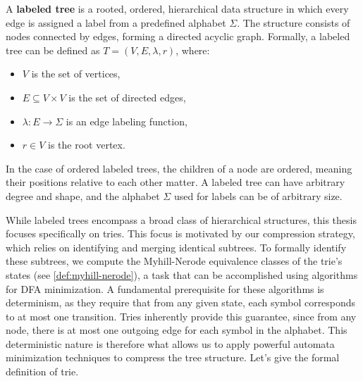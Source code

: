 \begin{definition} \label{def:labeled_tree}
    A \textbf{labeled tree} is a rooted, ordered, hierarchical data structure in which every edge is assigned a label from a predefined alphabet $\Sigma$. The structure consists of nodes connected by edges, forming a directed acyclic graph. Formally, a labeled tree can be defined as $T = (V, E, \lambda, r)$, where:
    \begin{itemize}
        \item $V$ is the set of vertices,
        \item $E \subseteq V \times V$ is the set of directed edges,
        \item $\lambda : E \to \Sigma$ is an edge labeling function,
        \item $r \in V$ is the root vertex.
    \end{itemize}
\end{definition}

In the case of ordered labeled trees, the children of a node are ordered, meaning their positions relative to each other matter. A labeled tree can have arbitrary degree and shape, and the alphabet $\Sigma$ used for labels can be of arbitrary size.

While labeled trees encompass a broad class of hierarchical structures, this thesis focuses specifically on tries. This focus is motivated by our compression strategy, which relies on identifying and merging identical subtrees. To formally identify these subtrees, we compute the Myhill-Nerode equivalence classes of the trie's states (see \cref{def:myhill-nerode}), a task that can be accomplished using algorithms for DFA minimization. A fundamental prerequisite for these algorithms is determinism, as they require that from any given state, each symbol corresponds to at most one transition. Tries inherently provide this guarantee, since from any node, there is at most one outgoing edge for each symbol in the alphabet. This deterministic nature is therefore what allows us to apply powerful automata minimization techniques to compress the tree structure. Let's give the formal definition of trie.

